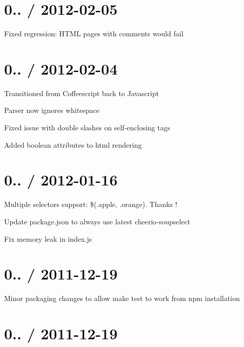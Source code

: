 \section*{0.. / 2012-\/02-\/05 }


\begin{DoxyItemize}
\item Fixed regression\+: H\+T\+ML pages with comments would fail
\end{DoxyItemize}

\section*{0.. / 2012-\/02-\/04 }


\begin{DoxyItemize}
\item Transitioned from Coffeescript back to Javascript
\item Parser now ignores whitespace
\item Fixed issue with double slashes on self-\/enclosing tags
\item Added boolean attributes to html rendering
\end{DoxyItemize}

\section*{0.. / 2012-\/01-\/16 }


\begin{DoxyItemize}
\item Multiple selectors support\+: \$(\textquotesingle{}.apple, .orange\textquotesingle{}). Thanks !
\item Update package.\+json to always use latest cheerio-\/soupselect
\item Fix memory leak in index.\+js
\end{DoxyItemize}

\section*{0.. / 2011-\/12-\/19 }


\begin{DoxyItemize}
\item Minor packaging changes to allow {\ttfamily make test} to work from npm installation
\end{DoxyItemize}

\section*{0.. / 2011-\/12-\/19 }


